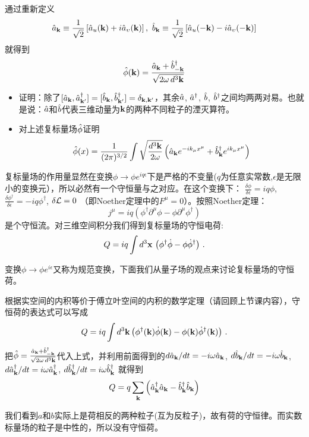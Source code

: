 \documentclass[CJK]{beamer}
\begin{document}
\begin{frame}
\bch

通过重新定义
$$\hata_\veck \equiv \frac{1}{\sqrt{2}}\left[\hata_u(\veck) + i\hata_\vel(\veck)\right],\ \hatb_\veck \equiv\frac{1}{\sqrt{2}}\left[\hata_u(-\veck) -i \hata_\vel(-\veck)\right]$$
就得到
$$\hat{\phi}({\mathbf{k}}) = \frac{\hat{a}_{{\mathbf{k}}}+{\hat{b}^\dagger}_{-{\mathbf{k}}}}{\sqrt{2\omega\, d^3{\mathbf{k}}}}$$

\ech
\end{frame}

\begin{frame}
\bch
\begin{itemize}
\item{证明：除了$[\hat{a}_{\mathbf{k}},{\hat{a}^\dagger}_{{\mathbf{k}}'}]=[\hat{b}_{\mathbf{k}},{\hat{b}^\dagger}_{{\mathbf{k}}'}]=\delta_{{\mathbf{k}},{\mathbf{k}}'}$，其余$\hat{a}$, ${\hat{a}^\dagger}$, $\hat{b}$, ${\hat{b}^\dagger}$之间均两两对易。也就是说：$\hat{a}$和$\hat{b}$代表三维动量为${\mathbf{k}}$的两种不同粒子的湮灭算符。}
\item{对上述复标量场$\hat{\phi}$证明$$\hat{\phi}(x) = \frac{1}{(2\pi)^{3/2}} \int \sqrt{\frac{d^3{\mathbf{k}}}{2\omega}} \left(\hat{a}_{{\mathbf{k}}} e^{-ik_\mu x^\mu} + {\hat{b}^\dagger}_{{\mathbf{k}}}e^{ik_\mu x^\mu}\right) $$}
\end{itemize}
\ech
\end{frame}

\begin{frame}
\bch
复标量场的作用量显然在变换$\phi \rightarrow \phi e^{iq\epsilon}$下是严格的不变量($q$为任意实常数,$\epsilon$是无限小的变换元），所以必然有一个守恒量与之对应。在这个变换下：
$\frac{\delta \phi}{\delta \epsilon} = iq\phi$, $\frac{\delta\phi^\dagger}{\delta\epsilon} = - i q\phi^\dagger$, $\delta {\mathcal{L}} = 0$ （即Noether定理中的$F^\mu = 0$）。按照Noether定理：
$$j^\mu = iq\left(\phi^\dagger\partial^\mu\phi-\phi\partial^\mu\phi^\dagger\right)$$
是个守恒流。对三维空间积分我们得到复标量场的守恒电荷:
$$Q = iq\int d^3{\mathbf{x}}\, \left(\phi^\dagger \dot\phi  - \phi \dot\phi^\dagger\right)\,.$$

\skipline
变换$\phi \rightarrow \phi e^{i\epsilon}$又称为规范变换，下面我们从量子场的观点来讨论复标量场的守恒荷。

\ech
\end{frame}

\begin{frame}
\bch
根据实空间的内积等价于傅立叶空间的内积的数学定理（请回顾上节课内容），守恒荷的表达式可以写成
$$Q = iq \int d^3{\mathbf{k}} \left(\phi^\dagger({\mathbf{k}}) \dot\phi ({\mathbf{k}}) - \phi ({\mathbf{k}})\dot\phi^\dagger({\mathbf{k}})\right)\, .$$
把$\hat{\phi} = \frac{\hat{a}_{\mathbf{k}} + {\hat{b}^\dagger}_{-{\mathbf{k}}}}{\sqrt{2\omega\, d^3{\mathbf{k}}}}$代入上式，并利用前面得到的$d \hat{a}_{\mathbf{k}}/dt = -i\omega\hat{a}_{\mathbf{k}}$, $d \hat{b}_{\mathbf{k}}/dt = -i\omega\hat{b}_{\mathbf{k}}$, $d{\hat{a}^\dagger}_{\mathbf{k}}/dt = i\omega{\hat{a}^\dagger}_{\mathbf{k}}$, $d{\hat{b}^\dagger}_{\mathbf{k}}/dt = i\omega {\hat{b}^\dagger}_{\mathbf{k}}$  就得到
$$Q =q\sum_{{\mathbf{k}}} \left({\hat{a}^\dagger}_{\mathbf{k}}\hat{a}_{\mathbf{k}} - {\hat{b}^\dagger}_{{\mathbf{k}}}\hat{b}_{{\mathbf{k}}}\right)$$

我们看到$a$和$b$实际上是荷相反的两种粒子(互为反粒子)，故有荷的守恒律。而实数标量场的粒子是中性的，所以没有守恒荷。
\ech
\end{frame}
\end{document}
